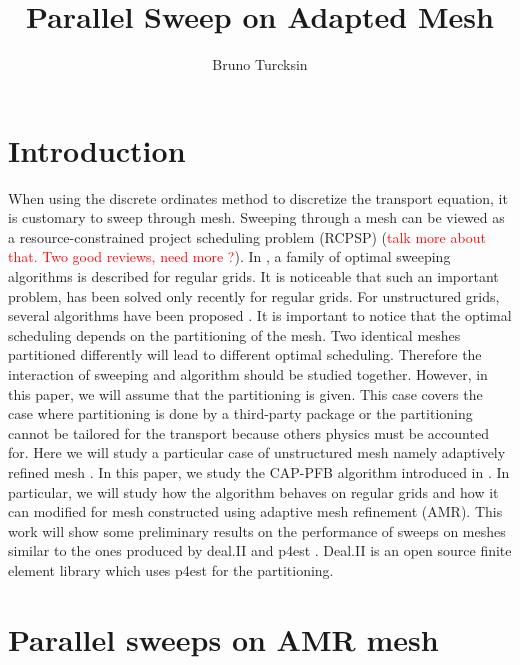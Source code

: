 \documentclass[letterpaper]{article}
\newcommand\red{\textcolor{red}}
\renewcommand{\(}{\left(}
\renewcommand{\)}{\right)}
\renewcommand{\[}{\left[}
\renewcommand{\]}{\right]}
\begin{document}
\title{Parallel Sweep on Adapted Mesh}
\author{Bruno Turcksin} 
\date{}
\maketitle

\section{Introduction}
When using the discrete ordinates method to discretize the transport equation,
it is customary to sweep through mesh. Sweeping through a mesh can be
viewed as a resource-constrained project scheduling problem (RCPSP) \cite{} (\red{talk more
about that. Two good reviews, need more ?}). In \cite{Adams2013}, a family of optimal sweeping algorithms is
described for regular grids. It is noticeable that such an important problem,
has been solved only recently for regular grids. For unstructured grids, several
algorithms have been proposed \cite{}. It is important to notice that the
optimal scheduling depends on the partitioning of the mesh. Two identical meshes
partitioned differently will lead to different optimal scheduling. Therefore the
interaction of sweeping and algorithm should be studied together. However, in
this paper, we will assume that the partitioning is given. This case covers the
case where partitioning is done by a third-party package \cite{} or the
partitioning cannot be tailored for the transport because others physics must be
accounted for. Here we will study a particular case of unstructured mesh namely
adaptively refined mesh \cite{}. In this paper, we study the CAP-PFB algorithm
introduced in \cite{Mo2014}. In particular, we will study how the algorithm
behaves on regular grids and how it can modified for mesh constructed using
adaptive mesh refinement (AMR). This work will show some preliminary results on
the performance of sweeps on meshes similar to the ones produced by deal.II
\cite{Bangerth2007,Bangerth2013} and p4est \cite{Burstedde2011}. Deal.II is an 
open source finite element library which uses p4est for the partitioning.


\section{Parallel sweeps on AMR mesh}
\end{document}
